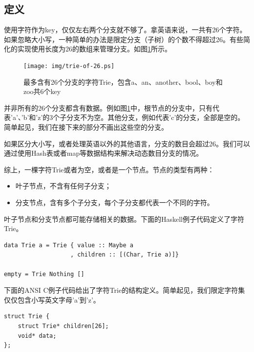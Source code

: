 \documentclass[b5paper]{ctexart}
\begin{document}
\subsection{定义}
使用字符作为key，仅仅左右两个分支就不够了。拿英语来说，一共有26个字符。如果忽略大小写，一种简单的办法是限定分支（子树）的个数不得超过26。有些简化的实现使用长度为26的数组来管理分支。如图\ref{fig:trie-of-26}所示。

\begin{figure}[htbp]
  \centering
  \texttt{[image: img/trie-of-26.ps]}
  \caption{最多含有26个分支的字符Trie，包含a、an、another、bool、boy和zoo共6个key}
  \label{fig:trie-of-26}
\end{figure}

并非所有的26个分支都含有数据。例如图\ref{fig:trie-of-26}中，根节点的分支中，只有代表'a'、'b'和'z'的3个子分支不为空。其他分支，例如代表'c'的分支，全部是空的。简单起见，我们在接下来的部分不画出这些空的分支。

如果区分大小写，或者处理英语以外的其他语言，分支的数目会超过26。我们可以通过使用Hash表或者map等数据结构来解决动态数目分支的情况。

综上，一棵字符Trie或者为空，或者是一个节点。节点的类型有两种：

\begin{itemize}
\item 叶子节点，不含有任何子分支；
\item 分支节点，含有多个子分支，每个子分支都代表一个不同的字符。
\end{itemize}

叶子节点和分支节点都可能存储相关的数据。下面的Haskell例子代码定义了字符Trie。

\lstset{language=Haskell}
\begin{lstlisting}[style=Haskell]
data Trie a = Trie { value :: Maybe a
                   , children :: [(Char, Trie a)]}

empty = Trie Nothing []
\end{lstlisting}

下面的ANSI C例子代码给出了字符Trie的结构定义。简单起见，我们限定字符集仅仅包含小写英文字母'a'到'z'。

\lstset{language=C}
\begin{lstlisting}
struct Trie {
    struct Trie* children[26];
    void* data;
};
\end{lstlisting}
\end{document}
